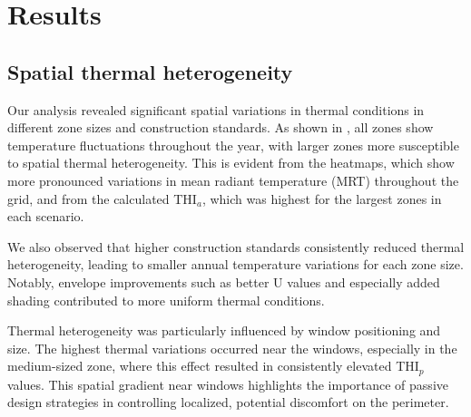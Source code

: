 
\section{Results}
\subsection{Spatial thermal heterogeneity}

Our analysis revealed significant spatial variations in thermal conditions in different zone sizes and construction standards. As shown in , all zones show temperature fluctuations throughout the year, with larger zones more susceptible to spatial thermal heterogeneity. This is evident from the heatmaps, which show more pronounced variations in mean radiant temperature (MRT) throughout the grid, and from the calculated THI$_a$, which was highest for the largest zones in each scenario.

We also observed that higher construction standards consistently reduced thermal heterogeneity, leading to smaller annual temperature variations for each zone size. Notably, envelope improvements such as better U values and especially added shading contributed to more uniform thermal conditions.

Thermal heterogeneity was particularly influenced by window positioning and size. The highest thermal variations occurred near the windows, especially in the medium-sized zone, where this effect resulted in consistently elevated THI$_p$ values. This spatial gradient near windows highlights the importance of passive design strategies in controlling localized, potential discomfort on the perimeter.

